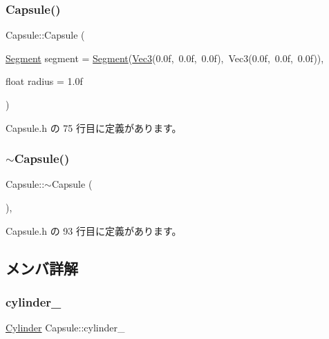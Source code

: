 \subsubsection{\texorpdfstring{Capsule()}{Capsule()}}
{\footnotesize\ttfamily Capsule\+::\+Capsule (\begin{DoxyParamCaption}\item[{\mbox{\hyperlink{class_segment}{Segment}}}]{segment = {\ttfamily \mbox{\hyperlink{class_segment}{Segment}}(\mbox{\hyperlink{_vector3_d_8h_ab16f59e4393f29a01ec8b9bbbabbe65d}{Vec3}}(0.0f,~0.0f,~0.0f),~Vec3(0.0f,~0.0f,~0.0f))},  }\item[{float}]{radius = {\ttfamily 1.0f} }\end{DoxyParamCaption})\hspace{0.3cm}{\ttfamily [inline]}}



 Capsule.\+h の 75 行目に定義があります。

\mbox{\label{class_capsule_abfd7f0348ce8e7f8ee4e70374ae27533}} 
\subsubsection{\texorpdfstring{$\sim$\+Capsule()}{~Capsule()}}
{\footnotesize\ttfamily Capsule\+::$\sim$\+Capsule (\begin{DoxyParamCaption}{ }\end{DoxyParamCaption})\hspace{0.3cm}{\ttfamily [inline]}, {\ttfamily [virtual]}}



 Capsule.\+h の 93 行目に定義があります。



\subsection{メンバ詳解}
\mbox{\label{class_capsule_a7b7f46d36a0d810555aa5eb62da6a8ed}} 
\subsubsection{\texorpdfstring{cylinder\+\_\+}{cylinder\_}}
{\footnotesize\ttfamily \mbox{\hyperlink{class_cylinder}{Cylinder}} Capsule\+::cylinder\+\_\+}



